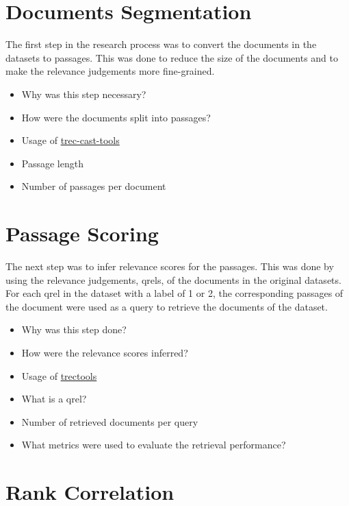 \section{Documents Segmentation}\label{document-segmentation}

The first step in the research process was to convert the documents in the datasets to passages. This was done to reduce the size of the documents and to make the relevance judgements more fine-grained.

\begin{itemize}
    \item Why was this step necessary?
    \item How were the documents split into passages?
    \item Usage of \href{https://github.com/grill-lab/trec-cast-tools/tree/master/corpus_processing/passage_chunkers}{trec-cast-tools}
    \item Passage length
    \item Number of passages per document
\end{itemize}

\section{Passage Scoring}\label{passage-scoring}

The next step was to infer relevance scores for the passages. This was done by using the relevance judgements, qrels, of the documents in the original datasets. For each qrel in the dataset with a label of 1 or 2, the corresponding passages of the document were used as a query to retrieve the documents of the dataset. 

\begin{itemize}
    \item Why was this step done?
    \item How were the relevance scores inferred?
    \item Usage of \href{https://github.com/joaopalotti/trectools}{trectools}
    \item What is a qrel?
    \item Number of retrieved documents per query
    \item What metrics were used to evaluate the retrieval performance?
\end{itemize}

\section{Rank Correlation}\label{rank-correlation-scores}

